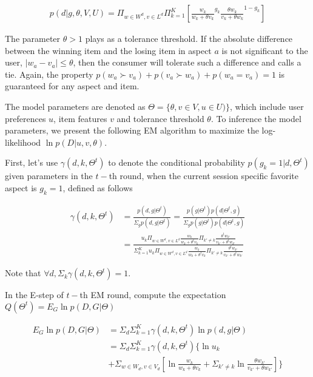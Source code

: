 \documentclass{sig-alternate}
\begin{document}
\begin{align}\label{equ:skyline}
		p(d|g,\theta,V,U) %
		=\Pi_{w\in W^d, v\in L^d} \Pi_{k=1}^{K}[ {\frac{w_k}{w_k+\theta v_k}}^{g_k} { \frac{\theta w_{k}}{v_{k}+\theta w_{k}}}^{1-g_k}]
\end{align}

The parameter $\theta>1$ plays as a tolerance threshold. If the absolute difference between the winning item and the losing item in aspect $a$ is not significant to the user, $|w_a-v_a|\leq \theta$, then the consumer will tolerate such a difference and calls a tie. Again, the property $p(w_a \succ v_a) + p(v_a \succ w_a) + p( w_a = v_a) =1$ is guaranteed for any aspect and item.
 



The model parameters are denoted as $\Theta=\{\theta,v\in V, u\in U)\}$, which include user preferences $u$, item features $v$ and tolerance threshold $\theta$. To inference the model parameters, we present the following EM algorithm to maximize the log-likelihood $\ln p(D|u,v,\theta)$. 

First, let's use $\gamma(d,k,\Theta^t)$ to denote the conditional probability $p(g_k=1|d,\Theta^t)$ given parameters in the $t-$th round, when the current session specific favorite aspect is $g_k=1$, defined as follows

\begin{align}\label{equ:conditional}
\gamma(d,k,\Theta^t) &=\frac{p(d,g|\Theta^t)}{\Sigma_g p(d,g|\Theta^t)} = \frac{p(g|\Theta^t)p(d|\Theta^t,g)}{\Sigma_g p(g|\Theta^t)p(d|\Theta^t,g)}\\\nonumber
&=\frac{u_k \Pi_{w \in W^d, v\in L^d} \frac{w_k}{w_k+\theta^t v_k}\Pi_{k'\neq k}\frac{\theta^t w_{k'}}{v_{k'}+\theta^t w_{k'}}}{\Sigma_{k=1}^K u_k \Pi_{w \in W^d, v\in L^d} \frac{w_k}{w_k+\theta^t v_k}\Pi_{k'\neq k}\frac{\theta^t w_{k'}}{v_{k'}+\theta^t w_{k'}}}
\end{align}

Note that $\forall d, \Sigma_k \gamma(d,k,\Theta^t)=1$.

In the E-step of $t-$th  EM round, compute the expectation $Q(\Theta^t)=E_{G} \ln p(D,G|\Theta) $

\begin{align}\label{equ:estep}
E_{G} \ln p(D,G|\Theta) & = \Sigma_d \Sigma_{k=1}^K \gamma(d,k,\Theta^t) \ln p(d,g|\Theta)\\\nonumber
& = \Sigma_d \Sigma_{k=1}^K \gamma(d,k,\Theta^t) \{ \ln u_k \\ \nonumber
&+ \Sigma_{w\in W_d, v\in V_d} [\ln \frac{w_k}{w_k +\theta v_k} +\Sigma_{k'\neq k} \ln \frac{\theta w_{k'}}{v_{k'}+\theta w_{k'}}]\}
\end{align}
\end{document}
